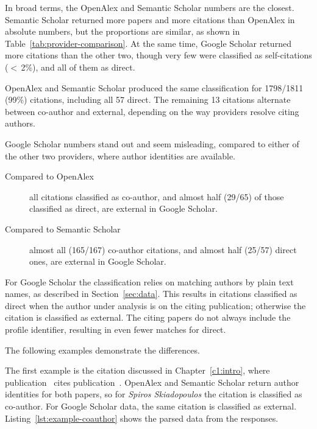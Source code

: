 In broad terms, the \textsf{OpenAlex} and \textsf{Semantic Scholar} numbers are the closest.
\textsf{Semantic Scholar} returned more papers and more citations than \textsf{OpenAlex} in absolute numbers, but the proportions are similar, as shown in Table~\ref{tab:provider-comparison}.
At the same time, \textsf{Google Scholar} returned more citations than the other two, though very few were classified as self-citations ($<$\,2\%), and all of them as \textsf{direct}.

\textsf{OpenAlex} and \textsf{Semantic Scholar} produced the same classification for 1798/1811 (99\%) citations, including all 57 \textsf{direct}.
The remaining 13 citations alternate between \textsf{co-author} and \textsf{external}, depending on the way providers resolve citing authors.

\textsf{Google Scholar} numbers stand out and seem misleading, compared to either of the other two providers, where author identities are available.

\begin{description}
    \item [Compared to \textsf{OpenAlex}] all citations classified as \textsf{co-author}, and almost half (29/65) of those classified as \textsf{direct}, are \textsf{external} in \textsf{Google Scholar}.
    \item [Compared to \textsf{Semantic Scholar}] almost all (165/167) \textsf{co-author} citations, and almost half (25/57) \textsf{direct} ones, are \textsf{external} in \textsf{Google Scholar}.
\end{description}

For \textsf{Google Scholar} the classification relies on matching authors by plain text names, as described in Section~\ref{sec:data}.
This results in citations classified as \textsf{direct} when the author under analysis is on the citing publication; otherwise the citation is classified as \textsf{external}.
The citing papers do not always include the profile identifier, resulting in even fewer matches for \textsf{direct}.

The following examples demonstrate the differences.

The first example is the citation discussed in Chapter~\ref{c1:intro}, where publication~\cite{Kalnis2007} cites publication~\cite{Ghinita2007}.
\textsf{OpenAlex} and \textsf{Semantic Scholar} return author identities for both papers, so for \emph{Spiros Skiadopoulos} the citation is classified as \textsf{co-author}.
For \textsf{Google Scholar} data, the same citation is classified as \textsf{external}.
Listing~\ref{lst:example-coauthor} shows the parsed data from the responses.


